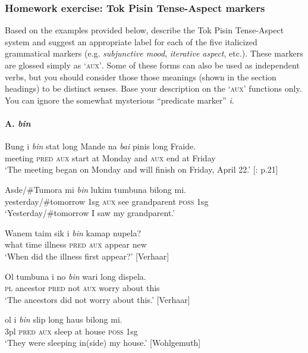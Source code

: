 \subsubsection{Homework exercise: Tok Pisin Tense-Aspect markers}\label{sec:}

Based on the examples provided below, describe the Tok Pisin Tense-Aspect system and suggest an appropriate label for each of the five italicized grammatical markers (e.g. \textit{subjunctive mood}, \textit{iterative aspect}, etc.). These markers are glossed simply as ‘\textsc{aux’}. Some of these forms can also be used as independent verbs, but you should consider those those meanings (shown in the section headings) to be distinct senses. Base your description on the ‘\textsc{aux’} functions only. You can ignore the somewhat mysterious “predicate marker” \textit{i}.


\paragraph{A. \textit{bin}}
\ea
\gll   Bung  i  \textit{bin}  stat  long  Mande  na  \textit{bai}  pinis  long  Fraide.\\
meeting  \textsc{pred}  \textsc{aux}  start  at  Monday  and  \textsc{aux}  end  at  Friday\\
\glt ‘The meeting began on Monday and will finish on Friday, April 22.’ [\citealt{Sebba1997}: p.21] 
\z

\ea
\gll  Asde/\#Tumora  mi  \textit{bin}  lukim  tumbuna  bilong  mi.\\
yesterday/\#tomorrow  1sg  \textsc{aux}  see  grandparent  \textsc{poss}  1sg\\
\glt ‘Yesterday/\#tomorrow I saw my grandparent.’
\z

\ea
\gll  Wanem  taim  sik  i  \textit{bin}  kamap  nupela?\\
what  time  illness  \textsc{pred}  \textsc{aux}  appear  new\\
\glt ‘When did the illness first appear?’  [Verhaar]
\z

\ea
\gll   Ol  tumbuna  i  no  \textit{bin}  wari  long  dispela.\\
\textsc{pl}  ancestor  \textsc{pred}  not  \textsc{aux}  worry  about  this\\
\glt ‘The ancestors did not worry about this.’  [Verhaar]
\z

\ea
\gll  ol  i  \textit{bin}  slip  long  haus  bilong  mi.\\
3pl  \textsc{pred}  \textsc{aux}  sleep  at  house  \textsc{poss}  1sg\\
\glt ‘They were sleeping in(side) my house.’  [Wohlgemuth]
\z

